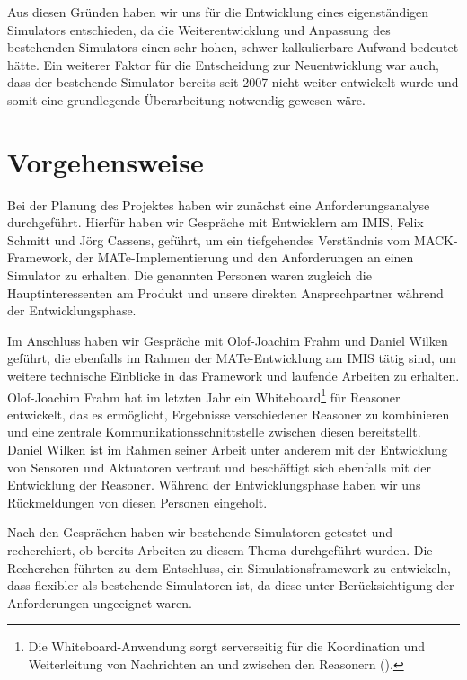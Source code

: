 Aus diesen Gründen haben wir uns für die Entwicklung eines eigenständigen Simulators entschieden, da die Weiterentwicklung und Anpassung des bestehenden Simulators einen sehr hohen, schwer kalkulierbare Aufwand bedeutet hätte. Ein weiterer Faktor für die Entscheidung zur Neuentwicklung war auch, dass der bestehende Simulator bereits seit 2007 nicht weiter entwickelt wurde und somit eine grundlegende Überarbeitung notwendig gewesen wäre.



\section{Vorgehensweise}\label{sec:approach}
Bei der Planung des Projektes haben wir zunächst eine Anforderungsanalyse durchgeführt. Hierfür haben wir Gespräche mit Entwicklern am IMIS, Felix Schmitt und Jörg Cassens, geführt, um ein tiefgehendes Verständnis vom MACK-Framework, der MATe-Implementierung und den Anforderungen an einen Simulator zu erhalten. Die genannten Personen waren zugleich die Hauptinteressenten am Produkt und unsere direkten Ansprechpartner während der Entwicklungsphase.

Im Anschluss haben wir Gespräche mit Olof-Joachim Frahm und Daniel Wilken geführt, die ebenfalls im Rahmen der MATe-Entwicklung am IMIS tätig sind, um weitere technische Einblicke in das Framework und laufende Arbeiten zu erhalten. Olof-Joachim Frahm hat im letzten Jahr ein Whiteboard\footnote{Die Whiteboard-Anwendung sorgt serverseitig für die Koordination und Weiterleitung von Nachrichten an und zwischen den Reasonern (\cite{frahmo}).} für Reasoner entwickelt, das es ermöglicht, Ergebnisse verschiedener Reasoner zu kombinieren und eine zentrale Kommunikationsschnittstelle zwischen diesen bereitstellt. Daniel Wilken ist im Rahmen seiner Arbeit unter anderem mit der Entwicklung von Sensoren und Aktuatoren vertraut und beschäftigt sich ebenfalls mit der Entwicklung der Reasoner. Während der Entwicklungsphase haben wir uns Rückmeldungen von diesen Personen eingeholt.

Nach den Gesprächen haben wir bestehende Simulatoren getestet und recherchiert, ob bereits Arbeiten zu diesem Thema durchgeführt wurden. Die Recherchen führten zu dem Entschluss, ein Simulationsframework zu entwickeln, dass flexibler als bestehende Simulatoren ist, da diese unter Berücksichtigung der Anforderungen ungeeignet waren.

